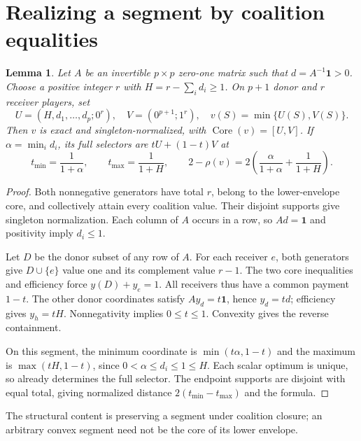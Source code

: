 \documentclass[11pt]{article}
\newtheorem{lemma}[theorem]{Lemma}
\newcommand{\Core}{\operatorname{Core}}
\begin{document}
\section{Realizing a segment by coalition equalities}
\begin{lemma}\label{lem:matrix}
Let $A$ be an invertible $p\times p$ zero-one matrix such that
$d=A^{-1}\mathbf1>0$. Choose a positive integer $r$ with
$H=r-\sum_i d_i\ge1$. On $p+1$ donor and $r$ receiver players, set
\[
 U=(H,d_1,\ldots,d_p;0^r),\quad V=(0^{p+1};1^r),\quad
 v(S)=\min\{U(S),V(S)\}.
\]
Then $v$ is exact and singleton-normalized, with $\Core(v)=[U,V]$.
If $\alpha=\min_i d_i$, its full selectors are $tU+(1-t)V$ at
\[
 t_{\min}=\frac1{1+\alpha},\qquad t_{\max}=\frac1{1+H},
 \qquad 2-\rho(v)=2\left(\frac\alpha{1+\alpha}+\frac1{1+H}\right).
\]
\end{lemma}
\begin{proof}
Both nonnegative generators have total $r$, belong to the lower-envelope
core, and collectively attain every coalition value. Their disjoint
supports give singleton normalization. Each column of $A$ occurs in a row,
so $Ad=\mathbf1$ and positivity imply $d_i\le1$.

Let $D$ be the donor subset of any row of $A$. For each receiver $e$,
both generators give $D\cup\{e\}$ value one and its complement value
$r-1$. The two core inequalities and efficiency force $y(D)+y_e=1$.
All receivers thus have a common payment $1-t$. The other donor coordinates
satisfy $Ay_d=t\mathbf1$, hence $y_d=td$; efficiency gives $y_h=tH$.
Nonnegativity implies $0\le t\le1$. Convexity gives the reverse containment.

On this segment, the minimum coordinate is $\min(t\alpha,1-t)$ and
the maximum is $\max(tH,1-t)$, since $0<\alpha\le d_i\le1\le H$.
Each scalar optimum is unique, so already determines the full selector.
The endpoint supports are disjoint with equal total, giving normalized
distance $2(t_{\min}-t_{\max})$ and the formula.
\end{proof}
The structural content is preserving a segment under coalition closure;
an arbitrary convex segment need not be the core of its lower envelope.
\end{document}
